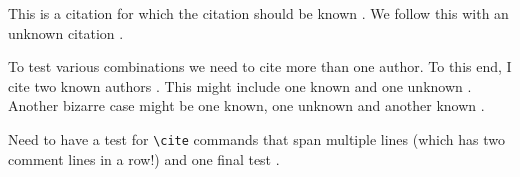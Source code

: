 \documentclass{article}
\begin{document}
This is a citation for which the citation should be known \cite{known}.
We follow this with an unknown citation \cite{unknown}.

To test various combinations we need to cite more than one author.  To this
end, I cite two known authors \cite{known,known2}.  This might include one
known and one unknown \cite{unknown,known}.  Another bizarre case might be
one known, one unknown and another known \cite{known,unknown,known2}.

Need to have a test for \verb#\cite# commands that span multiple lines \cite{
known,%
known2} (which has two comment lines in a row!) and one final test \cite{%
known, %
known2%
}.



\end{document}
